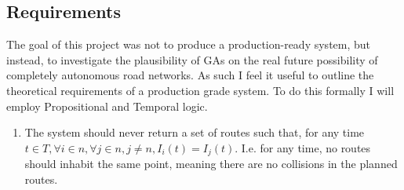 \subsection{Requirements}
\label{subsec:requirements}

The goal of this project was not to produce a production-ready system, but instead, to investigate the plausibility of GAs on the real future possibility of completely autonomous road networks. As such I feel it useful to outline the theoretical requirements of a production grade system. To do this formally I will employ Propositional and Temporal logic.

\begin{enumerate}
\item The system should never return a set of routes such that, for any time $t \in T, \forall i \in n, \forall j \in n, j \neq n, I_{i}(t) = I_{j}(t)$. I.e. for any time, no routes should inhabit the same point, meaning there are no collisions in the planned routes.
\end{enumerate}

